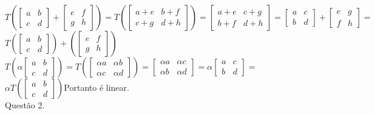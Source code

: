\documentclass[12pt]{article}
\begin{document}
$T\left(\begin{bmatrix}a&b\\c&d\end{bmatrix}+\begin{bmatrix}e&f\\g&h\end{bmatrix}\right)=T\left(\begin{bmatrix}a+e&b+f\\c+g&d+h\end{bmatrix}\right)=\begin{bmatrix}a+e&c+g\\b+f&d+h\end{bmatrix}=\begin{bmatrix}a&c\\b&d\end{bmatrix}+\begin{bmatrix}e&g\\f&h\end{bmatrix}=$\\

$T\left(\begin{bmatrix}a&b\\c&d\end{bmatrix}\right)+\left(\begin{bmatrix}e&f\\g&h\end{bmatrix}\right)$\\

$T\left(\alpha\begin{bmatrix}a&b\\c&d\end{bmatrix}\right)=T\left(\begin{bmatrix}\alpha a&\alpha b\\\alpha c&\alpha d\end{bmatrix}\right)=\begin{bmatrix}\alpha a&\alpha c\\\alpha b&\alpha d\end{bmatrix}=\alpha\begin{bmatrix}a&c\\b&d\end{bmatrix}=$\\

$\alpha T\left(\begin{bmatrix}a&b\\c&d\end{bmatrix}\right)$\hfill Portanto é linear.\\

\noindent Questão 2.\\
\end{document}
